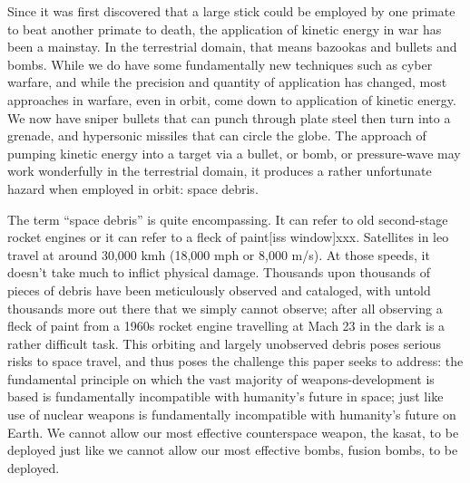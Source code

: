 {}

\titlenote{}

\maketitle

\thispagestyle{firstPage}

Since it was first discovered that a large stick could be employed by
one primate to beat another primate to death, the application of
kinetic energy in war has been a mainstay.  In the terrestrial domain,
that means bazookas and bullets and bombs.  While we do have some
fundamentally new techniques such as cyber warfare\cite{big-risks},
and while the precision and quantity of application has changed, most
approaches in warfare, even in orbit, come down to application of
kinetic energy.\cite{brian} We now have sniper bullets that can punch
through plate steel then turn into a grenade\cite[fancy sniper
  bullets]{xxx}, and hypersonic missiles that can circle the
globe.\cite[chinese hypersonic]{xxx}  The approach of pumping kinetic
energy into a target via a bullet, or bomb, or pressure-wave may work
wonderfully in the terrestrial domain, it produces a rather
unfortunate hazard when employed in orbit: space debris.

The term ``space debris'' is quite encompassing.  It can refer to old
second-stage rocket engines\cite[just about anything]{xxx} or it can
refer to a fleck of paint[iss window]{xxx}.  Satellites in \ac{leo}
travel at around 30,000 kmh (18,000 mph or 8,000
m/s).\cite[hyperphysics]{xxx} At those speeds, it doesn't take much to
inflict physical damage.  Thousands upon thousands of pieces of debris
have been meticulously observed and cataloged, with untold thousands
more out there that we simply cannot observe; after all observing a
fleck of paint from a 1960s rocket engine travelling at Mach 23 in the
dark is a rather difficult task.  This orbiting and largely unobserved
debris poses serious risks to space travel, and thus poses the
challenge this paper seeks to address: the fundamental principle on
which the vast majority of weapons-development is based is
fundamentally incompatible with humanity's future in space; just like
use of nuclear weapons is fundamentally incompatible with humanity's
future on Earth.  We cannot allow our most effective counterspace
weapon, the \acf{kasat}, to be deployed just like we cannot allow our
most effective bombs, fusion bombs, to be deployed.

